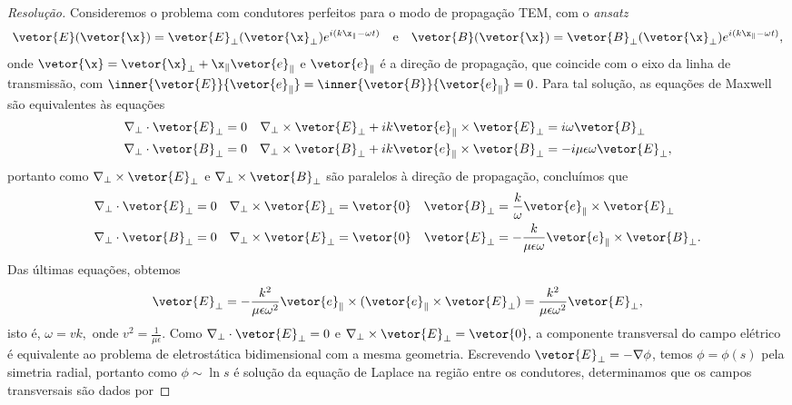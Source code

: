 \begin{proof}[Resolução]
    Consideremos o problema com condutores perfeitos para o modo de propagação TEM, com o \emph{ansatz}
    \begin{equation*}
        \vetor{E}(\vetor{\x}) = \vetor{E}_\perp(\vetor{\x}_\perp) e^{i(k \x_\parallel - \omega t)}
        \quad\text{e}\quad
        \vetor{B}(\vetor{\x}) = \vetor{B}_\perp(\vetor{\x}_\perp) e^{i(k \x_\parallel - \omega t)},
    \end{equation*}
    onde \(\vetor{\x} = \vetor{\x}_\perp + \x_\parallel\vetor{e}_\parallel\) e \(\vetor{e}_\parallel\) é a direção de propagação, que coincide com o eixo da linha de transmissão, com \(\inner{\vetor{E}}{\vetor{e}_\parallel} = \inner{\vetor{B}}{\vetor{e}_\parallel} = 0\). Para tal solução, as equações de Maxwell são equivalentes às equações
    \begin{align*}
        \nabla_\perp \cdot \vetor{E}_\perp &= 0&
        \nabla_\perp \times \vetor{E}_\perp + i k \vetor{e}_\parallel \times \vetor{E}_\perp &= i \omega \vetor{B}_\perp\\
        \nabla_\perp \cdot \vetor{B}_\perp &= 0&
        \nabla_\perp \times \vetor{B}_\perp + i k \vetor{e}_\parallel \times \vetor{B}_\perp &= -i \mu \epsilon \omega \vetor{E}_\perp,
    \end{align*}
    portanto como \(\nabla_\perp \times \vetor{E}_\perp\) e \(\nabla_\perp \times \vetor{B}_\perp\) são paralelos à direção de propagação, concluímos que
    \begin{align*}
        \nabla_\perp \cdot \vetor{E}_\perp &= 0&
        \nabla_\perp \times \vetor{E}_\perp &= \vetor{0}&
        \vetor{B}_\perp &= \frac{k}{\omega} \vetor{e}_\parallel \times \vetor{E}_\perp\\
        \nabla_\perp \cdot \vetor{B}_\perp &= 0&
        \nabla_\perp \times \vetor{E}_\perp &= \vetor{0}&
        \vetor{E}_\perp &= - \frac{k}{\mu \epsilon \omega} \vetor{e}_\parallel \times \vetor{B}_\perp.
    \end{align*}
    Das últimas equações, obtemos
    \begin{equation*}
        \vetor{E}_\perp = -\frac{k^2}{\mu \epsilon \omega^2} \vetor{e}_\parallel \times (\vetor{e}_\parallel \times \vetor{E}_\perp) = \frac{k^2}{\mu \epsilon \omega^2} \vetor{E}_\perp,
    \end{equation*}
    isto é, \(\omega = vk,\) onde \(v^2 = \frac{1}{\mu \epsilon}.\) Como \(\nabla_\perp \cdot \vetor{E}_\perp = 0\) e \(\nabla_\perp \times \vetor{E}_\perp = \vetor{0},\) a componente transversal do campo elétrico é equivalente ao problema de eletrostática bidimensional com a mesma geometria. Escrevendo \(\vetor{E}_\perp = -\nabla\phi\), temos \(\phi = \phi(s)\) pela simetria radial, portanto como \(\phi \sim \ln s\) é solução da equação de Laplace na região entre os condutores, determinamos que os campos transversais são dados por

\end{proof}
